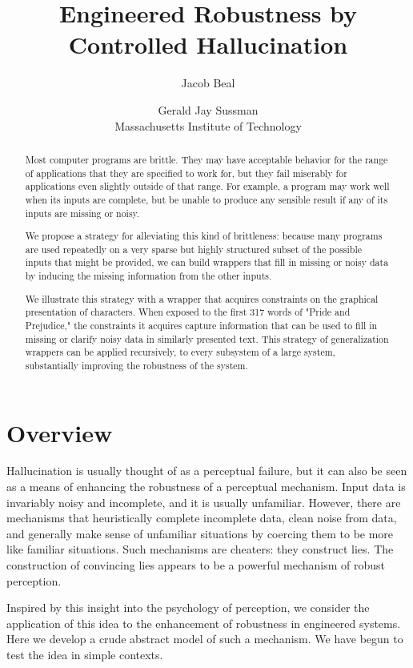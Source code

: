 \documentclass[letterpaper]{article}
\title{Engineered Robustness by Controlled Hallucination}
\author{Jacob Beal \and Gerald Jay Sussman\\
        Massachusetts Institute of Technology}
\begin{document}
\nocopyright
\maketitle

\begin{abstract}
  Most computer programs are brittle.  They may have acceptable
  behavior for the range of applications that they are specified to
  work for, but they fail miserably for applications even slightly
  outside of that range.  For example, a program may work well when
  its inputs are complete, but be unable to produce any sensible
  result if any of its inputs are missing or noisy.

  We propose a strategy for alleviating this kind of brittleness:
  because many programs are used repeatedly on a very sparse but
  highly structured subset of the possible inputs that might be
  provided, we can build wrappers that fill in missing or noisy data
  by inducing the missing information from the other inputs.

  We illustrate this strategy with a wrapper that acquires constraints
  on the graphical presentation of characters.  When exposed to the
  first 317 words of "Pride and Prejudice," the constraints it
  acquires capture information that can be used to fill in missing or
  clarify noisy data in similarly presented text.  This strategy of
  generalization wrappers can be applied recursively, to every
  subsystem of a large system, substantially improving the robustness
  of the system.
\end{abstract}

\section{Overview}

Hallucination is usually thought of as a perceptual failure, but it
can also be seen as a means of enhancing the robustness of a
perceptual mechanism.  Input data is invariably noisy and
incomplete, and it is usually unfamiliar.  However, there are
mechanisms that heuristically complete incomplete data, clean noise
from data, and generally make sense of unfamiliar situations by
coercing them to be more like familiar situations.  Such mechanisms
are cheaters: they construct lies.  The construction of convincing
lies appears to be a powerful mechanism of robust perception.

Inspired by this insight into the psychology of perception, we
consider the application of this idea to the enhancement of robustness
in engineered systems.  Here we develop a crude abstract model of such
a mechanism.  We have begun to test the idea in simple contexts.
\end{document}
